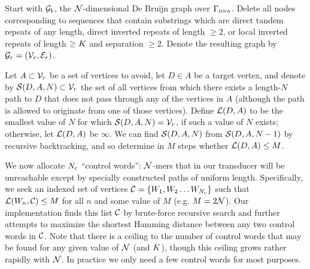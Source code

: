 \documentclass[english]{article}
\begin{document}
Start with ${\cal G}_b$, the ${\cal N}$-dimensional De Bruijn graph over $\Gamma_{\mbox{\tiny DNA}}$.
Delete all nodes corresponding to sequences that contain substrings which are
direct tandem repeats of any length,
direct inverted repeats of length $\geq 2$,
or local inverted repeats of length $\geq K$ and separation $\geq 2$.
Denote the resulting graph by ${\cal G}_r = ({\cal V}_r,{\cal E}_r)$.

Let $A \subset {\cal V}_r$ be a set of vertices to avoid,
let $D \in A$ be a target vertex,
and denote by ${\cal S}(D,A,N) \subset {\cal V}_r$
the set of all vertices
from which there exists a length-$N$ path to $D$
that does not pass through any of the vertices in $A$
(although the path is allowed to originate from one of those vertices).
Define ${\cal L}(D,A)$ to be the smallest value of $N$ for which ${\cal S}(D,A,N) = {\cal V}_r$,
if such a value of $N$ exists; otherwise, let ${\cal L}(D,A)$ be $\infty$.
We can find ${\cal S}(D,A,N)$ from ${\cal S}(D,A,N-1)$ by recursive backtracking,
and so determine in $M$ steps whether ${\cal L}(D,A) \leq M$.

We now allocate $N_c$ ``control words'': ${\cal N}$-mers that in our transducer
will be unreachable except by specially constructed paths of uniform length.
Specifically, we seek an indexed set of vertices
${\cal C} = \{ W_1, W_2 \ldots W_{N_c} \}$
such that ${\cal L}(W_n,{\cal C}) \leq M$ for all $n$
and some value of $M$ (e.g. $M = 2{\cal N}$).
Our implementation finds this list ${\cal C}$ by brute-force recursive search
and further attempts to maximize the shortest Hamming distance between any two control words in ${\cal C}$.
Note that there is a ceiling to the number of control words that may be found
for any given value of ${\cal N}$ (and $K$),
though this ceiling grows rather rapidly with ${\cal N}$.
In practice we only need a few control words for most purposes.
\end{document}
